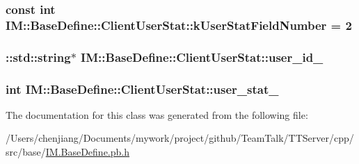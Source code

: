 \subsubsection[{k\+User\+Stat\+Field\+Number}]{\setlength{\rightskip}{0pt plus 5cm}const int I\+M\+::\+Base\+Define\+::\+Client\+User\+Stat\+::k\+User\+Stat\+Field\+Number = 2\hspace{0.3cm}{\ttfamily [static]}}\label{class_i_m_1_1_base_define_1_1_client_user_stat_a69c758663ecebe87ec2050d741146706}
\hypertarget{class_i_m_1_1_base_define_1_1_client_user_stat_a36a355c54537e21c0b7c3f6ccc341aad}{}
\subsubsection[{user\+\_\+id\+\_\+}]{\setlength{\rightskip}{0pt plus 5cm}\+::std\+::string$\ast$ I\+M\+::\+Base\+Define\+::\+Client\+User\+Stat\+::user\+\_\+id\+\_\+\hspace{0.3cm}{\ttfamily [private]}}\label{class_i_m_1_1_base_define_1_1_client_user_stat_a36a355c54537e21c0b7c3f6ccc341aad}
\hypertarget{class_i_m_1_1_base_define_1_1_client_user_stat_adfb5dc6d7b60c4ac240ef877449388b6}{}
\subsubsection[{user\+\_\+stat\+\_\+}]{\setlength{\rightskip}{0pt plus 5cm}int I\+M\+::\+Base\+Define\+::\+Client\+User\+Stat\+::user\+\_\+stat\+\_\+\hspace{0.3cm}{\ttfamily [private]}}\label{class_i_m_1_1_base_define_1_1_client_user_stat_adfb5dc6d7b60c4ac240ef877449388b6}


The documentation for this class was generated from the following file\+:\begin{DoxyCompactItemize}
\item 
/\+Users/chenjiang/\+Documents/mywork/project/github/\+Team\+Talk/\+T\+T\+Server/cpp/src/base/\hyperlink{_i_m_8_base_define_8pb_8h}{I\+M.\+Base\+Define.\+pb.\+h}\end{DoxyCompactItemize}
